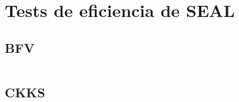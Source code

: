 \chapter{Tests de eficiencia de SEAL}
\label{appendix:benchmarks_seal}

\section{BFV}
\inputminted{text}{apendices/benchmark_bfv_seal.txt}

\section{CKKS}

\inputminted{text}{apendices/benchmark_ckks_seal.txt}
